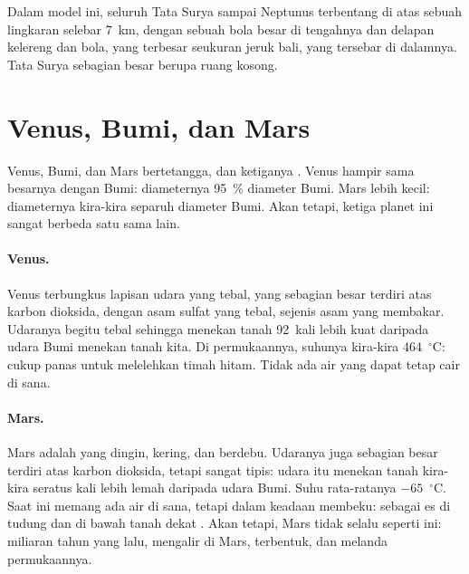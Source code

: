 Dalam model ini, seluruh Tata Surya sampai Neptunus terbentang di atas
sebuah lingkaran selebar 7~km, dengan sebuah bola besar di tengahnya dan
delapan kelereng dan bola, yang terbesar seukuran jeruk bali, yang
tersebar di dalamnya. Tata Surya sebagian besar berupa ruang kosong.

\section{Venus, Bumi, dan Mars}

Venus, Bumi, dan Mars bertetangga, dan ketiganya . Venus
hampir sama besarnya dengan Bumi: diameternya 95~\% diameter Bumi. Mars
lebih kecil: diameternya kira-kira separuh diameter Bumi. Akan tetapi,
ketiga planet ini sangat berbeda satu sama lain.

\paragraph{Venus.} Venus terbungkus lapisan udara yang tebal, yang sebagian
besar terdiri atas karbon dioksida, dengan  asam sulfat yang tebal,
sejenis asam yang membakar. Udaranya begitu tebal sehingga menekan tanah
92~kali lebih kuat daripada udara Bumi menekan tanah kita. Di permukaannya,
suhunya kira-kira 464~$^\circ$C: cukup panas untuk melelehkan timah hitam.
Tidak ada air yang dapat tetap cair di sana.

\paragraph{Mars.} Mars adalah  yang dingin, kering, dan berdebu.
Udaranya juga sebagian besar terdiri atas karbon dioksida, tetapi sangat
tipis: udara itu menekan tanah kira-kira seratus kali lebih lemah daripada
udara Bumi. Suhu rata-ratanya $-65$~$^\circ$C. Saat ini memang ada air di
sana, tetapi dalam keadaan membeku: sebagai es di tudung  dan di bawah
tanah dekat . Akan tetapi, Mars tidak selalu seperti ini: miliaran
tahun yang lalu,  mengalir di Mars,  terbentuk, dan
 melanda permukaannya.

